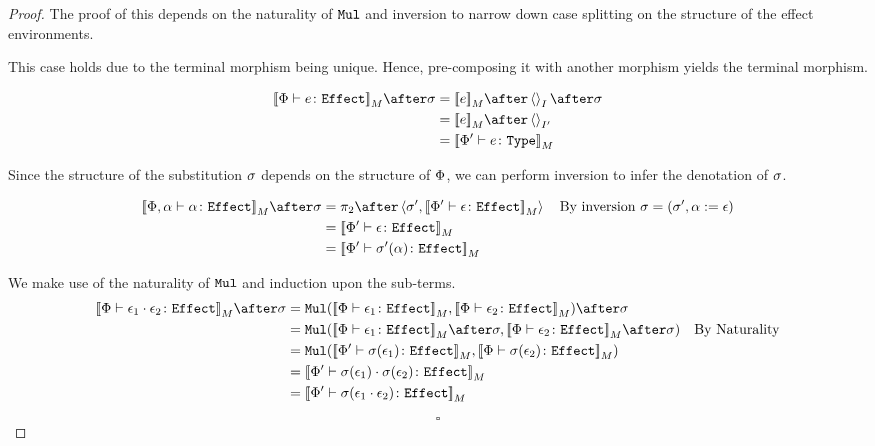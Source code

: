 \documentclass{Report}
\begin{document}
\begin{proof}
    The proof of this depends on the naturality of $\Mul$ and inversion to narrow down case splitting on the structure of the effect environments.

    This case holds due to the terminal morphism being unique. Hence, pre-composing it with another morphism yields the terminal morphism.

    \begin{align}
        \deno{\typerelation{\P}{e}{\effect}}\after\si & = \deno{e}\after\term{I}\after\si \\
        & = \deno{e}\after\term{I'} \\
        & = \deno{\typerelation{\P'}{e}{\type}}\\
    \end{align}


Since the structure of the substitution $\si$ depends on the structure of $\P$, we can perform inversion to infer the denotation of $\si$.

\begin{align}
    \deno{\typerelation{\P,\a}{\a}{\effect}}\after\si &= \pp\after\pr{\si'}{\deno{\typerelation{\P'}{\e}{\effect}}}\qt{By inversion $\si = (\si', \a\setto\e)$}\\
    & =\deno{\typerelation{\P'}{\e}{\effect}} \\
    &= \deno{\typerelation{\P'}{\si'(\a)}{\effect}}\\
\end{align}



We make use of the naturality of $\Mul$ and induction upon the sub-terms.
\begin{align}
    \deno{\typerelation{\P}{\e_1\dot\e_2}{\effect}} \after\si &=
    \Mul(\deno{\typerelation{\P}{\e_1}{\effect}}, \deno{\typerelation{\P}{\e_2}{\effect}})\after \si \\
    & = \Mul(\deno{\typerelation{\P}{\e_1}{\effect}}\after \si, \deno{\typerelation{\P}{\e_2}{\effect}}\after \si)\qt{By Naturality}\\
    & = \Mul(\deno{\typerelation{\P'}{\si(\e_1)}{\effect}}, \deno{\typerelation{\P}{\si(\e_2)}{\effect}})\\
    & = \deno{\typerelation{\P'}{\si(\e_1)\dot\si(\e_2)}{\effect}}\\
    & = \deno{\typerelation{\P'}{\si(\e_1\dot\e_2)}{\effect}}\\
\end{align}

$$\square$$
\end{proof}
\end{document}
